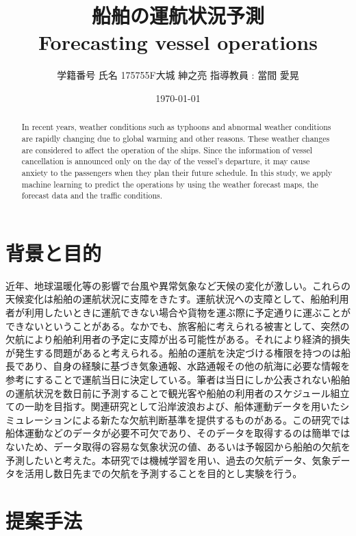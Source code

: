 \documentclass[twocolumn,twoside,9.5pt]{jsarticle}
\begin{document}
\title{船舶の運航状況予測\\
Forecasting vessel operations}
\author{学籍番号 氏名 {175755F}{大城 紳之亮} 指導教員 : {當間 愛晃}}
\date{\today}
\begin{abstract}
In recent years, weather conditions such as typhoons and abnormal weather conditions are rapidly changing due to global warming and other reasons. These weather changes are considered to affect the operation of the ships. Since the information of vessel cancellation is announced only on the day of the vessel's departure, it may cause anxiety to the passengers when they plan their future schedule. In this study, we apply machine learning to predict the operations by using the weather forecast maps, the forecast data and the traffic conditions.
\end{abstract} 
\maketitle

\thispagestyle{fancy}


\section{背景と目的}
近年、地球温暖化等の影響で台風や異常気象など天候の変化が激しい\cite{earth}。これらの天候変化は船舶の運航状況に支障をきたす。運航状況への支障として、船舶利用者が利用したいときに運航できない場合や貨物を運ぶ際に予定通りに運ぶことができないということがある。なかでも、旅客船に考えられる被害として、突然の欠航により船舶利用者の予定に支障が出る可能性がある。それにより経済的損失が発生する問題があると考えられる。船舶の運航を決定づける権限を持つのは船長であり、自身の経験に基づき気象通報、水路通報その他の航海に必要な情報を参考にすることで運航当日に決定している\cite{stan}。筆者は当日にしか公表されない船舶の運航状況を数日前に予測することで観光客や船舶の利用者のスケジュール組立ての一助を目指す。関連研究として沿岸波浪および、船体運動データを用いたシミュレーションによる新たな欠航判断基準を提供するものがある\cite{Related-Research1}。この研究では船体運動などのデータが必要不可欠であり、そのデータを取得するのは簡単ではないため、データ取得の容易な気象状況の値、あるいは予報図から船舶の欠航を予測したいと考えた。本研究では機械学習を用い、過去の欠航データ、気象データを活用し数日先までの欠航を予測することを目的とし実験を行う。

\section{提案手法}
\end{document}
